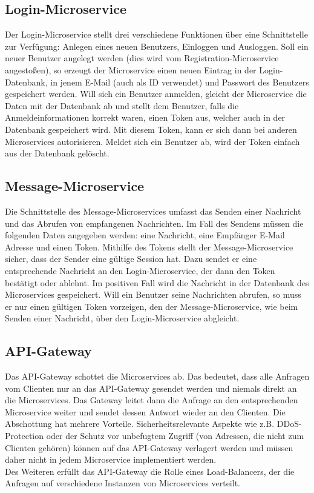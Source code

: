 \subsection{Login-Microservice}
Der Login-Microservice stellt drei verschiedene Funktionen über eine Schnittstelle zur Verfügung: Anlegen eines neuen Benutzers, Einloggen und Ausloggen. Soll ein neuer Benutzer angelegt werden (dies wird vom Registration-Microservice angestoßen), so erzeugt der Microservice einen neuen Eintrag in der Login-Datenbank, in jenem E-Mail (auch als ID verwendet) und Passwort des Benutzers gespeichert werden. Will sich ein Benutzer anmelden, gleicht der Microservice die Daten mit der Datenbank ab und stellt dem Benutzer, falls die Anmeldeinformationen korrekt waren, einen Token aus, welcher auch in der Datenbank gespeichert wird. Mit diesem Token, kann er sich dann bei anderen Microservices autorisieren. Meldet sich ein Benutzer ab, wird der Token einfach aus der Datenbank gelöscht.

\subsection{Message-Microservice}
Die Schnittstelle des Message-Microservices umfasst das Senden einer Nachricht und das Abrufen von empfangenen Nachrichten. Im Fall des Sendens müssen die folgenden Daten angegeben werden: eine Nachricht, eine Empfänger E-Mail Adresse und einen Token. Mithilfe des Tokens stellt der Message-Microservice sicher, dass der Sender eine gültige Session hat. Dazu sendet er eine entsprechende Nachricht an den Login-Microservice, der dann den Token bestätigt oder ablehnt. Im positiven Fall wird die Nachricht in der Datenbank des Microservices gespeichert. Will ein Benutzer seine Nachrichten abrufen, so muss er nur einen gültigen Token vorzeigen, den der Message-Microservice, wie beim Senden einer Nachricht, über den Login-Microservice abgleicht.

\subsection{API-Gateway}
Das API-Gateway schottet die Microservices ab. Das bedeutet, dass alle Anfragen vom Clienten nur an das API-Gateway gesendet werden und niemals direkt an die Microservices. Das Gateway leitet dann die Anfrage an den entsprechenden Microservice weiter und sendet dessen Antwort wieder an den Clienten. Die Abschottung hat mehrere Vorteile. Sicherheitsrelevante Aspekte wie z.B. DDoS-Protection oder der Schutz vor unbefugtem Zugriff (von Adressen, die nicht zum Clienten gehören) können auf das API-Gateway verlagert werden und müssen daher nicht in jedem Microservice implementiert werden.\\
Des Weiteren erfüllt das API-Gateway die Rolle eines Load-Balancers, der die Anfragen auf verschiedene Instanzen von Microservices verteilt. 

